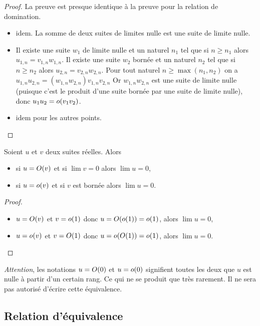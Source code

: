 \begin{proof}
  La preuve est presque identique à la preuve pour la relation de domination.
  \begin{itemize}
  \item idem. La somme de deux suites de limites nulle est une suite de limite nulle.
  \item Il existe une suite \(w_1\) de limite nulle et un naturel \(n_1\) tel que si \(n \geqslant n_1\) alors \(u_{1,n} = v_{1,n} w_{1,n}\). Il existe une suite \(w_2\) bornée et un naturel \(n_2\) tel que si \(n \geqslant n_2\) alors \(u_{2,n} = v_{2,n} w_{2,n}\). Pour tout naturel \(n \geqslant \max(n_1,n_2)\) on a \(u_{1,n}u_{2,n} = (w_{1,n}w_{2,n}) v_{1,n}v_{2,n}\) Or \(w_{1,n}w_{2,n}\) est une suite de limite nulle (puisque c'est le produit d'une suite bornée par une suite de limite nulle), donc \(u_1u_2 = o\mathopen{}\left(v_1 v_2\right)\).
  \item idem pour les autres points.
  \end{itemize}
\end{proof}
\begin{prop}
  Soient \(u\) et \(v\) deux suites réelles. Alors
  \begin{itemize}
  \item si \(u = O\mathopen{}\left(v\right)\) et si \(\lim v = 0\) alors \(\lim u = 0\),
  \item si \(u = o\mathopen{}\left(v\right)\) et si \(v\) est bornée alors \(\lim u = 0\).
  \end{itemize}
\end{prop}
\begin{proof}
  \begin{itemize}
  \item \(u = O\mathopen{}\left(v\right)\) et \(v = o\mathopen{}\left(1\right)\) donc \(u=O\mathopen{}\left(o\mathopen{}\left(1\right)\right) = o\mathopen{}\left(1\right)\), alors \(\lim u =0\),
  \item \(u = o\mathopen{}\left(v\right)\) et \(v = O\mathopen{}\left(1\right)\) donc \(u=o\mathopen{}\left(O\mathopen{}\left(1\right)\right) = o\mathopen{}\left(1\right)\), alors \(\lim u =0\).
  \end{itemize}
\end{proof}

\emph{Attention}, les notations \(u = O\mathopen{}\left(0\right)\) et \(u = o\mathopen{}\left(0\right)\) signifient toutes les deux que \(u\) est nulle à partir d'un certain rang. Ce qui ne se produit que très rarement. Il ne sera pas autorisé d'écrire cette équivalence.

\subsection{Relation d'équivalence}

